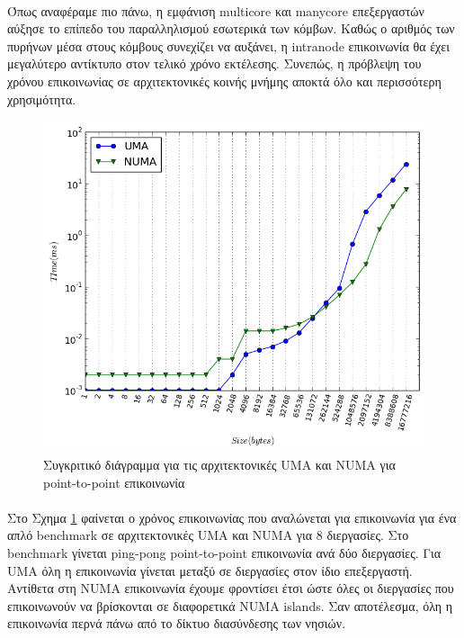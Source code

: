 \paragraph{}
Όπως αναφέραμε πιο πάνω, η εμφάνιση multicore και manycore επεξεργαστών αύξησε το επίπεδο του παραλληλισμού εσωτερικά των κόμβων. Καθώς ο αριθμός των πυρήνων μέσα στους κόμβους συνεχίζει να αυξάνει, η intranode επικοινωνία θα έχει μεγαλύτερο αντίκτυπο στον τελικό χρόνο εκτέλεσης. Συνεπώς, η πρόβλεψη του χρόνου επικοινωνίας σε αρχιτεκτονικές κοινής μνήμης αποκτά όλο και περισσότερη χρησιμότητα.
\begin{figure}[t]
    \centering
    \captionsetup{justification=centering,margin=0cm}
    \includegraphics[width=\textwidth]{./images/NUMAvsUMA.png}
    \caption{Συγκριτικό διάγραμμα για τις αρχιτεκτονικές UMA και NUMA για point-to-point επικοινωνία}
    \label{fig:UMAvsNUMA}
\end{figure}
\paragraph{}
Στο Σχημα \ref{fig:UMAvsNUMA} φαίνεται ο χρόνος επικοινωνίας που αναλώνεται για επικοινωνία για ένα απλό benchmark σε αρχιτεκτονικές UMA και NUMA για 8 διεργασίες. Στο benchmark γίνεται ping-pong point-to-point επικοινωνία ανά δύο διεργασίες. Για UMA όλη η επικοινωνία γίνεται μεταξύ σε διεργασίες στον ίδιο επεξεργαστή. Αντίθετα στη NUMA επικοινωνία έχουμε φροντίσει έτσι ώστε όλες οι διεργασίες που επικοινωνούν να βρίσκονται σε διαφορετικά NUMA islands. Σαν αποτέλεσμα, όλη η επικοινωνία περνά πάνω από το δίκτυο διασύνδεσης των νησιών.

